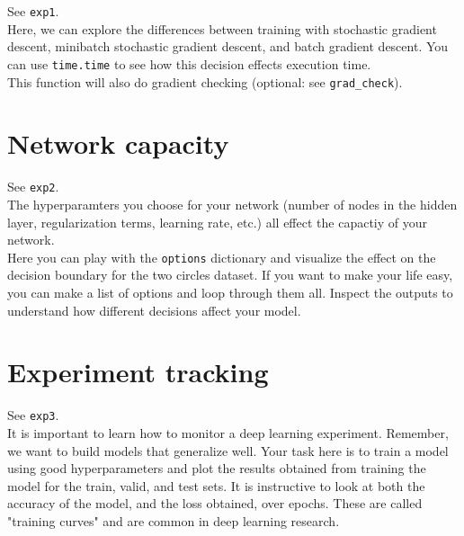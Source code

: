 \documentclass[reqno]{amsart}
\theoremstyle{definition}
\theoremstyle{remark}
\numberwithin{equation}{section}
\begin{document}
See \texttt{exp1}. \\

Here, we can explore the differences between training with stochastic gradient
descent, minibatch stochastic gradient descent, and batch gradient descent.
You can use \texttt{time.time\(\)} to see how this decision effects execution
time. \\

This function will also do gradient checking (optional:
see \texttt{grad\_check}).

\section{Network capacity}

See \texttt{exp2}. \\

The hyperparamters you choose for your network (number of nodes in the hidden
layer, regularization terms, learning rate, etc.) all effect the capactiy
of your network. \\

Here you can play with the \texttt{options} dictionary and visualize the effect
on the decision boundary for the two circles dataset. If you want to make your
life easy, you can make a list of options and loop through them all. Inspect the
outputs to understand how different decisions affect your model.

\section{Experiment tracking}

See \texttt{exp3}. \\

It is important to learn how to monitor a deep learning experiment. Remember,
we want to build models that generalize well. Your task here is to train a model
using good hyperparameters and plot the results obtained from training the
model for the train, valid, and test sets. It is instructive to look at both
the accuracy of the model, and the loss obtained, over epochs. These are called
"training curves" and are common in deep learning research.
\end{document}
